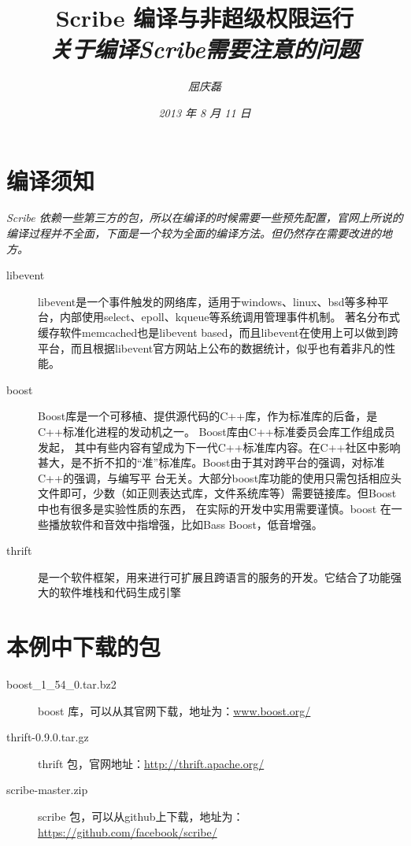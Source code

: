 \documentclass{article}
\begin{document}
\title{%
  {\huge \textsf{Scribe 编译与非超级权限运行}\\\smallskip}%
  {\small \textit{关于编译Scribe需要注意的问题}}
}

\author{\textit{屈庆磊}\\[2mm]
       }

\date{\textit{2013 年 8 月 11 日}}

\maketitle
\begin{multicols}{2}
\tableofcontents
\end{multicols}


\section{编译须知}
\textit{
Scribe 依赖一些第三方的包，所以在编译的时候需要一些预先配置，官网上所说的编译过程并不全面，下面是一个较为全面的编译方法。但仍然存在需要改进的地方。
}

\begin{description}
\item[libevent] libevent是一个事件触发的网络库，适用于windows、linux、bsd等多种平台，内部使用select、epoll、kqueue等系统调用管理事件机制。
著名分布式缓存软件memcached也是libevent based，而且libevent在使用上可以做到跨平台，而且根据libevent官方网站上公布的数据统计，似乎也有着非凡的性能。
\item[boost] Boost库是一个可移植、提供源代码的C++库，作为标准库的后备，是C++标准化进程的发动机之一。 Boost库由C++标准委员会库工作组成员发起，
其中有些内容有望成为下一代C++标准库内容。在C++社区中影响甚大，是不折不扣的“准”标准库。Boost由于其对跨平台的强调，对标准C++的强调，与编写平
台无关。大部分boost库功能的使用只需包括相应头文件即可，少数（如正则表达式库，文件系统库等）需要链接库。但Boost中也有很多是实验性质的东西，
在实际的开发中实用需要谨慎。boost 在一些播放软件和音效中指增强，比如Bass Boost，低音增强。
\item[thrift] 是一个软件框架，用来进行可扩展且跨语言的服务的开发。它结合了功能强大的软件堆栈和代码生成引擎
\end{description}

\section{本例中下载的包}
\begin{description}
\item[boost\_1\_54\_0.tar.bz2] boost 库，可以从其官网下载，地址为：\url{www.boost.org/}
\item[thrift-0.9.0.tar.gz] thrift 包，官网地址：\url{http://thrift.apache.org/}
\item[scribe-master.zip] scribe 包，可以从github上下载，地址为：\url{https://github.com/facebook/scribe/}
\end{description}
\end{document}
